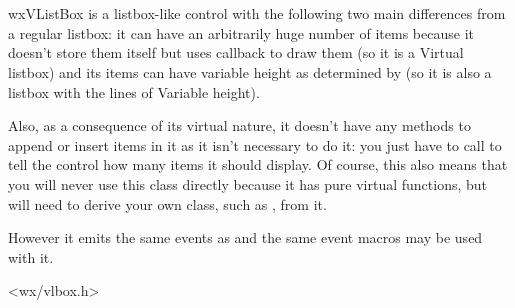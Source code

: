 
\section{}\label{wxvlistbox}

wxVListBox is a listbox-like control with the following two main differences
from a regular listbox: it can have an arbitrarily huge number of items because
it doesn't store them itself but uses  
callback to draw them (so it is a {\Large V}irtual listbox) and its items can
have variable height as determined by 
 (so it is also a listbox
with the lines of {\Large V}ariable height).

Also, as a consequence of its virtual nature, it doesn't have any methods to
append or insert items in it as it isn't necessary to do it: you just have to
call  to tell the control how
many items it should display. Of course, this also means that you will never
use this class directly because it has pure virtual functions, but will need to
derive your own class, such as , from it.

However it emits the same events as  and the same
event macros may be used with it.
 



<wx/vlbox.h>



\label{wxvlistboxctor}


